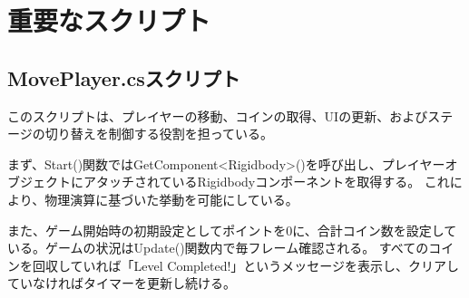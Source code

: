 \documentclass{jlreq}
\begin{document}
\section{重要なスクリプト}
\subsection{MovePlayer.csスクリプト}
このスクリプトは、プレイヤーの移動、コインの取得、UIの更新、およびステージの切り替えを制御する役割を担っている。

まず、Start()関数ではGetComponent<Rigidbody>()を呼び出し、プレイヤーオブジェクトにアタッチされているRigidbodyコンポーネントを取得する。
これにより、物理演算に基づいた挙動を可能にしている。

また、ゲーム開始時の初期設定としてポイントを0に、合計コイン数を設定している。ゲームの状況はUpdate()関数内で毎フレーム確認される。
すべてのコインを回収していれば「Level Completed!」というメッセージを表示し、クリアしていなければタイマーを更新し続ける。
\end{document}
